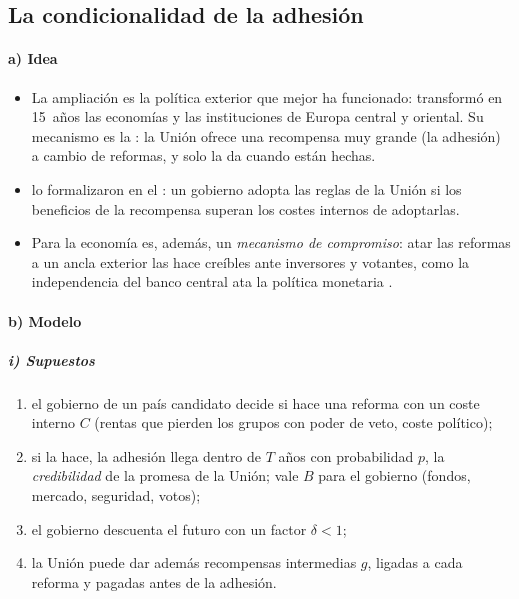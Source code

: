\documentclass[11pt]{article}
\begin{document}
\subsection{La condicionalidad de la adhesión}\label{anexo:condicionalidad}

\paragraph{a) Idea}

\begin{itemize}
\item La ampliación es la política exterior que mejor ha funcionado: transformó en 15~años las economías y las instituciones de Europa central y oriental. Su mecanismo es la : la Unión ofrece una recompensa muy grande (la adhesión) a cambio de reformas, y solo la da cuando están hechas.
\item \textcite{SchimmelfennigSedelmeier2004} lo formalizaron en el : un gobierno adopta las reglas de la Unión si los beneficios de la recompensa superan los costes internos de adoptarlas.
\item Para la economía es, además, un \emph{mecanismo de compromiso}: atar las reformas a un ancla exterior las hace creíbles ante inversores y votantes, como la independencia del banco central ata la política monetaria .
\end{itemize}

\paragraph{b) Modelo}

\subparagraph{i) Supuestos}

  \begin{enumerate}
  \item el gobierno de un país candidato decide si hace una reforma con un coste interno $C$ (rentas que pierden los grupos con poder de veto, coste político);
  \item si la hace, la adhesión llega dentro de $T$ años con probabilidad $p$, la \emph{credibilidad} de la promesa de la Unión; vale $B$ para el gobierno (fondos, mercado, seguridad, votos);
  \item el gobierno descuenta el futuro con un factor $\delta<1$;
  \item la Unión puede dar además recompensas intermedias $g$, ligadas a cada reforma y pagadas antes de la adhesión.
  \end{enumerate}
\end{document}
